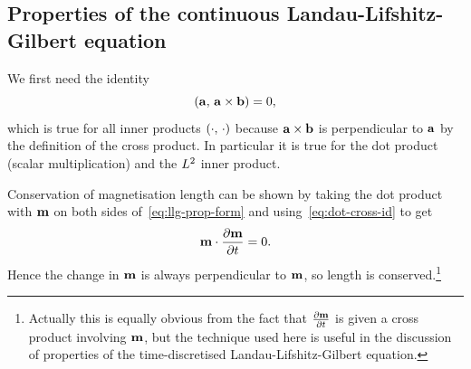 
\subsection{Properties of the continuous Landau-Lifshitz-Gilbert equation}
\label{sec:prop-cont-llg}

We first need the identity
\begin{equation}
  \label{eq:dot-cross-id}
  \left({\mathbf{a}},\, {\mathbf{a}} \times {\mathbf{b}} \right) = 0,
\end{equation}
which is true for all inner products $\left(\cdot,\, \cdot \right)$ because ${\mathbf{a}} \times {\mathbf{b}}$ is perpendicular to ${\mathbf{a}}$ by the definition of the cross product.
In particular it is true for the dot product (scalar multiplication) and the $L^2$ inner product.

Conservation of magnetisation length can be shown by taking the dot product with $\mathbf{m}$ on both sides of~\eqref{eq:llg-prop-form} and using~\eqref{eq:dot-cross-id} to get
\begin{equation}
  \label{eq:56}
  \mathbf{m} \cdot \frac{\partial \mathbf{m}}{\partial t} = 0.
\end{equation}
Hence the change in $\mathbf{m}$ is always perpendicular to $\mathbf{m}$, so length is conserved.\footnote{Actually this is equally obvious from the fact that $\frac{\partial \mathbf{m}}{\partial t}$ is given a cross product involving $\mathbf{m}$, but the technique used here is useful in the discussion of properties of the time-discretised Landau-Lifshitz-Gilbert equation.}

